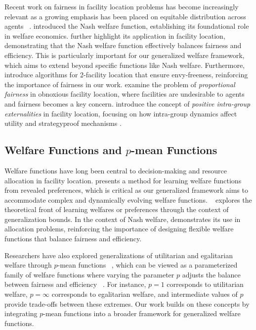 Recent work on fairness in facility location problems has become increasingly relevant as a growing emphasis has been placed on equitable distribution across agents ~\cite{Li_Li_Chan_2024,chen2020strategyproof,lam2021balancing}. \cite{moulin2004fair} introduced the Nash welfare function, establishing its foundational role in welfare economics. \cite{lam2023nash} further highlight its application in facility location, demonstrating that the Nash welfare function effectively balances fairness and efficiency.
 This is particularly important for our generalized welfare framework, which aims to extend beyond specific functions like Nash welfare. Furthermore, \cite{chen2020strategyproof} introduce algorithms for 2-facility location that ensure envy-freeness, reinforcing the importance of fairness in our work.  \cite{aziz2023proportional} examine the problem of \textit{proportional fairness} in obnoxious facility location, where facilities are undesirable to agents and fairness becomes a key concern. \cite{wang2024positive} introduce the concept of \textit{positive intra-group externalities} in facility location, focusing on how intra-group dynamics affect utility and strategyproof mechanisms \cite{wang2024positive}. 

\subsection{Welfare Functions and $p$-mean Functions}
Welfare functions have long been central to decision-making and resource allocation in facility location. 
\cite{balcan2014learning} presents a method for learning welfare functions from revealed preferences, which is critical as our generalized framework aims to accommodate complex and dynamically evolving welfare functions. ~\cite{pardeshi2024learning} explores the theoretical front of learning welfares or preferences through the context of generalization bounds. In the context of Nash welfare, \cite{Kurokawa2016} demonstrates its use in allocation problems, reinforcing the importance of designing flexible welfare functions that balance fairness and efficiency.

Researchers have also explored generalizations of utilitarian and egalitarian welfare through $p$-mean functions ~\cite{gupta2022l_p}, which can be viewed as a parameterized family of welfare functions where varying the parameter $p$ adjusts the balance between fairness and efficiency ~\cite{daskin2015p}. For instance, $p = 1$ corresponds to utilitarian welfare, $p = \infty$ corresponds to egalitarian welfare, and intermediate values of $p$ provide trade-offs between these extremes. Our work builds on these concepts by integrating $p$-mean functions into a broader framework for generalized welfare functions.

